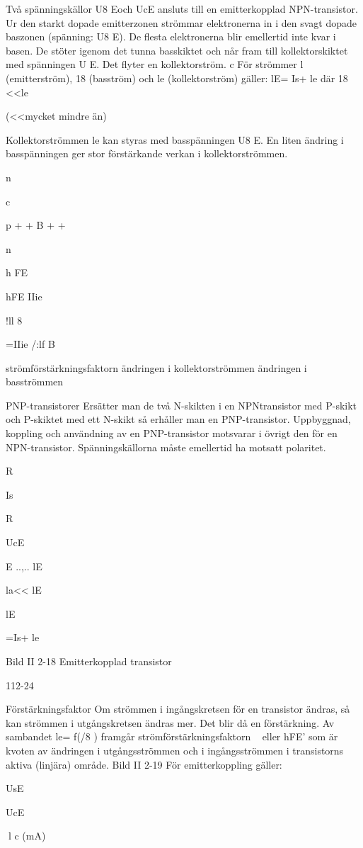 \documentclass[a4paper,twoside,twocolumn,openright]{book}
\begin{document}
{{{Två spänningskällor U8 Eoch UcE ansluts till
en emitterkopplad NPN-transistor.
Ur den starkt dopade emitterzonen strömmar elektronerna in i den svagt dopade
baszonen (spänning: U8 E). De flesta elektronerna blir emellertid inte kvar i basen. De
stöter igenom det tunna basskiktet och når
fram till kollektorskiktet med spänningen U E.
Det flyter en kollektorström.
c
För strömmer l (emitterström), 18 (basström) och le (kollektorström) gäller:
lE= Is+ le där 18 <<le

(<<mycket mindre än)

Kollektorströmmen le kan styras med basspänningen U8 E.
En liten ändring i basspänningen ger stor
förstärkande verkan i kollektorströmmen.

n

c

p + + B
+ +

n

h
FE

hFE
IIie

!ll 8

=IIie
/:lf
B

strömförstärkningsfaktorn
ändringen i kollektorströmmen
ändringen i basströmmen

PNP-transistorer
Ersätter man de två N-skikten i en NPNtransistor med P-skikt och P-skiktet med ett
N-skikt så erhåller man en PNP-transistor.
Uppbyggnad, koppling och användning
av en PNP-transistor motsvarar i övrigt den
för en NPN-transistor. Spänningskällorna
måste emellertid ha motsatt polaritet.

R

Is

R

UcE

E
..,..
lE

la<< lE

lE

=Is+ le

Bild II 2-18 Emitterkopplad transistor

112-24

Förstärkningsfaktor
Om strömmen i ingångskretsen för en transistor ändras, så kan strömmen i utgångskretsen ändras mer. Det blir då en förstärkning.
Av sambandet le= f(/8 ) framgår strömförstärkningsfaktorn ~ eller hFE' som är kvoten av ändringen i utgångsströmmen och i
ingångsströmmen i transistorns aktiva (linjära) område.
Bild II 2-19
För emitterkoppling gäller:

UsE

UcE

l c (mA)

}}}
\end{document}
